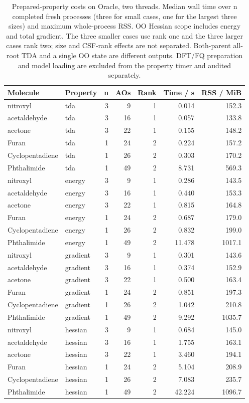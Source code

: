 \begin{table}[!htbp]
\centering\small
\caption{Prepared-property costs on Oracle, two threads. Median wall time over n completed fresh processes (three for small cases, one for the largest three sizes) and maximum whole-process RSS. OO Hessian scope includes energy and total gradient. The three smaller cases use rank one and the three larger cases rank two; size and CSF-rank effects are not separated. Both-parent all-root TDA and a single OO state are different outputs. DFT/FQ preparation and model loading are excluded from the property timer and audited separately.}\label{tab:finalcost}
\begin{tabular}{llrrrrr}
\toprule
Molecule & Property & n & AOs & Rank & Time / s & RSS / MiB \\
\midrule
nitroxyl & tda & 3 & 9 & 1 & 0.014 & 152.3 \\
acetaldehyde & tda & 3 & 16 & 1 & 0.057 & 133.8 \\
acetone & tda & 3 & 22 & 1 & 0.155 & 148.2 \\
Furan & tda & 1 & 24 & 2 & 0.224 & 157.2 \\
Cyclopentadiene & tda & 1 & 26 & 2 & 0.303 & 170.2 \\
Phthalimide & tda & 1 & 49 & 2 & 8.731 & 569.3 \\
nitroxyl & energy & 3 & 9 & 1 & 0.286 & 143.5 \\
acetaldehyde & energy & 3 & 16 & 1 & 0.440 & 153.3 \\
acetone & energy & 3 & 22 & 1 & 0.815 & 164.8 \\
Furan & energy & 1 & 24 & 2 & 0.687 & 179.0 \\
Cyclopentadiene & energy & 1 & 26 & 2 & 0.832 & 199.0 \\
Phthalimide & energy & 1 & 49 & 2 & 11.478 & 1017.1 \\
nitroxyl & gradient & 3 & 9 & 1 & 0.301 & 143.6 \\
acetaldehyde & gradient & 3 & 16 & 1 & 0.374 & 152.9 \\
acetone & gradient & 3 & 22 & 1 & 0.500 & 163.4 \\
Furan & gradient & 1 & 24 & 2 & 0.851 & 197.3 \\
Cyclopentadiene & gradient & 1 & 26 & 2 & 1.042 & 210.8 \\
Phthalimide & gradient & 1 & 49 & 2 & 9.292 & 1035.7 \\
nitroxyl & hessian & 3 & 9 & 1 & 0.684 & 145.0 \\
acetaldehyde & hessian & 3 & 16 & 1 & 1.755 & 163.1 \\
acetone & hessian & 3 & 22 & 1 & 3.460 & 194.1 \\
Furan & hessian & 1 & 24 & 2 & 5.104 & 208.9 \\
Cyclopentadiene & hessian & 1 & 26 & 2 & 7.083 & 235.7 \\
Phthalimide & hessian & 1 & 49 & 2 & 42.224 & 1096.7 \\
\bottomrule
\end{tabular}
\end{table}
